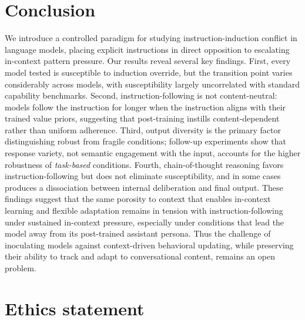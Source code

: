 \documentclass{article} %
\begin{document}
\section{Conclusion}
\label{sec:conclusion}

We introduce a controlled paradigm for studying instruction-induction conflict in language models, placing explicit instructions in direct opposition to escalating in-context pattern pressure. Our results reveal several key findings. First, every model tested is susceptible to induction override, but the transition point varies considerably across models, with susceptibility largely uncorrelated with standard capability benchmarks. Second, instruction-following is not content-neutral: models follow the instruction for longer when the instruction aligns with their trained value priors, suggesting that post-training instills content-dependent rather than uniform adherence. Third, output diversity is the primary factor distinguishing robust from fragile conditions; follow-up experiments show that response variety, not semantic engagement with the input, accounts for the higher robustness of \emph{task-based} conditions. Fourth, chain-of-thought reasoning favors instruction-following but does not eliminate susceptibility, and in some cases produces a dissociation between internal deliberation and final output. These findings suggest that the same porosity to context that enables in-context learning and flexible adaptation remains in tension with instruction-following under sustained in-context pressure, especially under conditions that lead the model away from its post-trained assistant persona. Thus the challenge of inoculating models against context-driven behavioral updating, while preserving their ability to track and adapt to conversational content, remains an open problem.





\section*{Ethics statement}
\end{document}

